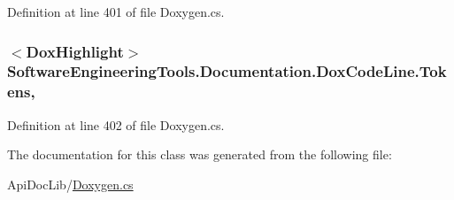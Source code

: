 Definition at line 401 of file Doxygen.\+cs.

\hypertarget{class_software_engineering_tools_1_1_documentation_1_1_dox_code_line_a6f991a58ace2ff0c216f0a8095081db0}{
\subsubsection[{Tokens}]{$<${\bf Dox\+Highlight}$>$ Software\+Engineering\+Tools.\+Documentation.\+Dox\+Code\+Line.\+Tokens\hspace{0.3cm}{\ttfamily [get]}, {\ttfamily [set]}}}\label{class_software_engineering_tools_1_1_documentation_1_1_dox_code_line_a6f991a58ace2ff0c216f0a8095081db0}


Definition at line 402 of file Doxygen.\+cs.



The documentation for this class was generated from the following file\+:\begin{DoxyCompactItemize}
\item 
Api\+Doc\+Lib/\hyperlink{_doxygen_8cs}{Doxygen.\+cs}\end{DoxyCompactItemize}
